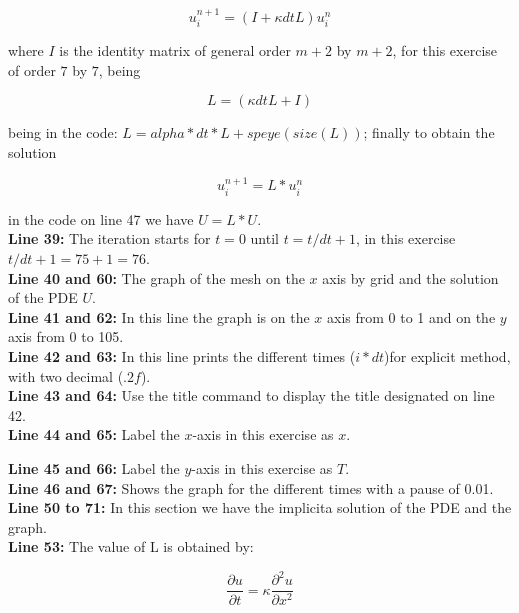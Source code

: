 \begin{equation}
	u^{n+1}_{i} = (I  +  \kappa dt L )u^{n}_{i}
\end{equation}

where $I$ is the identity matrix of general order $m+2$ by $m+2$, for this exercise of order $7$ by $7$, being

$$  L = (\kappa dt L +I )$$

being in the code: $ L = alpha*dt*L + speye(size(L))$; finally to obtain the solution

\begin{equation}
	u^{n+1}_{i} = L *u^{n}_{i}
\end{equation}

in the code on line 47 we have $ U = L*U.$\\


\textbf{Line 39:} The iteration starts for $t=0$ until $t=t/dt+1$, in this exercise $t/dt+1= 75+1=76$.\\


\textbf{Line 40 and 60:} The graph of the mesh on the $x$ axis by grid and the solution of the PDE $U$. \\


\textbf{Line 41 and 62:} In this line the graph is on the $x$ axis from 0 to 1 and on the $y$ axis from 0 to 105.\\


\textbf{Line 42 and 63:} In this line prints the different times ($ i* dt$)for explicit method, with two decimal  ($ .2f $).\\


\textbf{Line 43 and 64:} Use the title command to display the title designated on line 42. \\


\textbf{Line 44 and 65:} Label the $x$-axis in this exercise as $x$.


\textbf{Line 45 and 66:} Label the $y$-axis in this exercise as $T$.\\


\textbf{Line 46 and 67:} Shows the graph for the different times with a pause of 0.01. \\


\textbf{Line 50 to 71:} In this section we have the implicita solution of the PDE and the graph. \\

\textbf{Line 53:} The value of L is obtained by:

\begin{equation}
	\frac{\partial u}{\partial t} = \kappa \frac{\partial^{2} u}{\partial x^{2}}
\end{equation}

